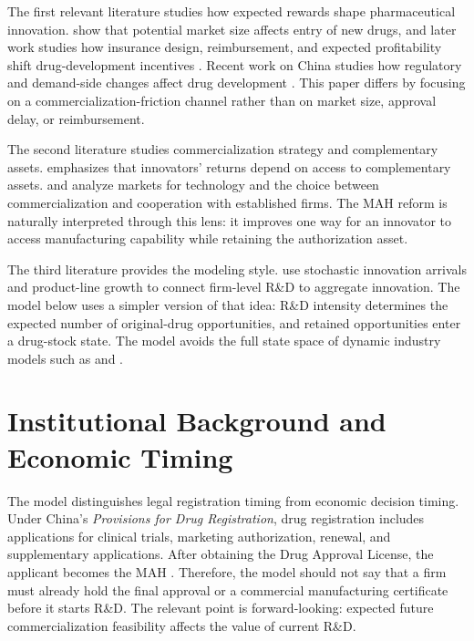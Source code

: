 \documentclass[12pt]{article}
\newcommand{\1}{\mathbf{1}}
\begin{document}
The first relevant literature studies how expected rewards shape pharmaceutical innovation. \citet{AcemogluLinn2004} show that potential market size affects entry of new drugs, and later work studies how insurance design, reimbursement, and expected profitability shift drug-development incentives \citep{Finkelstein2004,BlumeKohoutSood2013,DuboisDeMouzonScottMortonSeabright2015,BudishRoinWilliams2015,DranoveGarthwaiteHermosilla2014}. Recent work on China studies how regulatory and demand-side changes affect drug development \citep{JiaMaYangZhang2023,BarwickXiaXia2026}. This paper differs by focusing on a commercialization-friction channel rather than on market size, approval delay, or reimbursement.

The second literature studies commercialization strategy and complementary assets. \citet{Teece1986} emphasizes that innovators' returns depend on access to complementary assets. \citet{AroraFosfuriGambardella2001} and \citet{GansStern2003} analyze markets for technology and the choice between commercialization and cooperation with established firms. The MAH reform is naturally interpreted through this lens: it improves one way for an innovator to access manufacturing capability while retaining the authorization asset.

The third literature provides the modeling style. \citet{KletteKortum2004} use stochastic innovation arrivals and product-line growth to connect firm-level R\&D to aggregate innovation. The model below uses a simpler version of that idea: R\&D intensity determines the expected number of original-drug opportunities, and retained opportunities enter a drug-stock state. The model avoids the full state space of dynamic industry models such as \citet{EricsonPakes1995} and \citet{BajariBenkardLevin2007}.

\section{Institutional Background and Economic Timing}

The model distinguishes legal registration timing from economic decision timing. Under China's \textit{Provisions for Drug Registration}, drug registration includes applications for clinical trials, marketing authorization, renewal, and supplementary applications. After obtaining the Drug Approval License, the applicant becomes the MAH \citep{NMPARegistration2022}. Therefore, the model should not say that a firm must already hold the final approval or a commercial manufacturing certificate before it starts R\&D. The relevant point is forward-looking: expected future commercialization feasibility affects the value of current R\&D.
\end{document}

